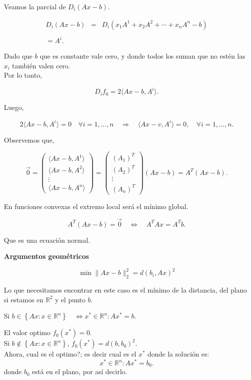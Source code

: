 Veamos la parcial de $D_i\left(Ax-b\right)$.

$$
\begin{array}{rcl}
    D_i\left(Ax-b\right)&=&D_i\left(x_1A^1+x_2A^2+\cdots+x_nA^n-b\right)\\\\
    =A^i.
\end{array}
$$

Dado que $b$ que es constante vale cero, y donde todos los suman que no estén las $x_i$ también valen cero.\\

Por lo tanto,

$$D_if_0 = 2\langle Ax-b,A^i \rangle.$$

Luego,

$$2\langle Ax-b,A^i \rangle = 0 \quad \forall i=1,\ldots,n \quad \Rightarrow \quad \langle Ax-v,A^i\rangle=0,\quad \forall i = 1,\ldots,n.$$

Observemos que,

$$
\overrightarrow{0} = 
\begin{pmatrix}
    \langle Ax-b,A^1\rangle\\
    \langle Ax-b,A^2\rangle\\
    \vdots\\
    \langle Ax-b,A^n\rangle
\end{pmatrix}
=
\begin{pmatrix}
    (A_1)^T\\
    (A_2)^T\\
    \vdots\\
    (A_n)^T
\end{pmatrix}
(Ax-b)
=A^T(Ax-b).
$$

En funciones convexas el extremo local será el mínimo global.

$$A^T(Ax-b)=\overrightarrow{0}\quad \Leftrightarrow\quad A^TAx=A^Tb.$$

Que es una ecuación normal.

\textbf{Argumentos geométricos}

$$\min \|Ax-b\|^2_2 = d(b_i,Ax)^2$$

Lo que necesitamos encontrar en este caso es el mínimo de la distancia, del plano si estamos en $\mathbb{R}^2$ y el punto $b$.

Si $b\in \left\{Ax:x\in \mathbb{R}^n\right\}\quad \Leftrightarrow x^* \in \mathbb{R}^n : Ax^* =b.$

El valor optimo $f_0(x^*)=0.$\\

Si $b\notin \left\{Ax:x\in \mathbb{R}^n\right\}$, $f_0(x^*)=d(b,b_0)^2$.\\

Ahora, cual es el optimo?; es decir cual es el $x^*$
donde la solución es:
$$x^*\in \mathbb{R}^n : Ax^*=b_0.$$ donde $b_0$ está en el plano, por así decirlo.\\




